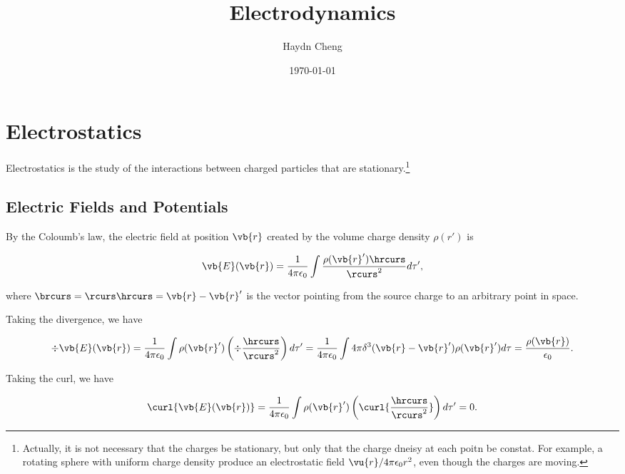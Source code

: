\documentclass[english,a4paper,12pt]{report}
\title{Electrodynamics}
\author{Haydn Cheng}
\date{\today}
\begin{document}
\maketitle
\tableofcontents
    
\chapter{Electrostatics}

Electrostatics is the study of the interactions between charged particles that are stationary.\footnote{Actually, it is not necessary that the charges be stationary, but only that the charge dneisy at each poitn be constat. For example, a rotating sphere with uniform charge density produce an electrostatic field \( \vu{r} / 4\pi \epsilon_0 r^2 \), even though the charges are moving.} 

\section{Electric Fields and Potentials}


By the Coloumb's law, the electric field at position \(\vb{r} \) created by the volume charge density \(\rho (r')\) is

\begin{equation}
    \vb{E}(  \vb{r}) = \frac{1}{4\pi \epsilon_0} \int \frac{\rho ( \vb{r}' ) \hrcurs}{\rcurs ^2}   d\tau ', \label{comb} 
\end{equation}

where \(\brcurs = \rcurs \hrcurs = \vb{r} -\vb{r} '\) is the vector pointing from the source charge to an arbitrary point in space.

Taking the divergence, we have 

\begin{equation}\label{gauss} 
    \div{\vb{E}(\vb{r} )} = \frac{1}{4\pi\epsilon_0} \int \rho (\vb{r} ') \left(\div{\frac{\hrcurs }{\rcurs ^2} }\right) d\tau ' = \frac{1}{4\pi \epsilon_0} \int 4\pi \delta ^3 (\vb{r} - \vb{r} ')\rho (\vb{r} ') d\tau = \frac{\rho (\vb{r} )}{\epsilon _0}.  	 
\end{equation}

Taking the curl, we have 

\begin{equation}
    \curl{\vb{E}(\vb{r} ) } = \frac{1}{4\pi \epsilon_0} \int \rho(\vb{r} ') \left( \curl{ \frac{\hrcurs }{\rcurs ^2}  }\right)  d\tau'  = 0.
\end{equation}
\end{document}
